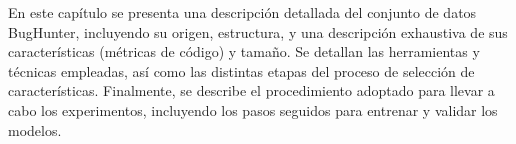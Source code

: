 En este capítulo se presenta una descripción detallada del conjunto de datos BugHunter, incluyendo su origen, estructura, y una descripción exhaustiva de sus características (métricas de código) y tamaño. Se detallan las herramientas y técnicas empleadas, así como las distintas etapas del proceso de selección de características. Finalmente, se describe el procedimiento adoptado para llevar a cabo los experimentos, incluyendo los pasos seguidos para entrenar y validar los modelos.





\newpage

